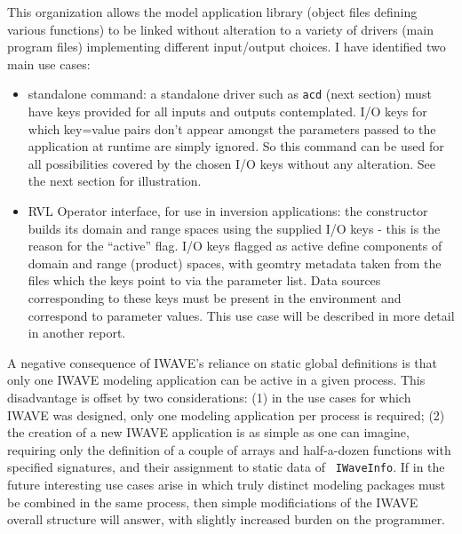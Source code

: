 This organization allows the model application library (object files
defining various functions) to be linked
without alteration to a variety of
drivers (main program files) implementing different input/output 
choices. I have identified two main use cases:
\begin{itemize}
\item standalone command: a standalone driver such as {\tt acd} (next
  section) must have keys provided for all inputs and outputs
  contemplated. I/O keys for which key=value pairs don't appear
  amongst the parameters passed to the application at runtime are simply
  ignored. So this command can be used for all possibilities covered
  by the chosen I/O keys without any alteration. See the next section
  for illustration.
\item RVL Operator interface, for use in inversion applications: the constructor builds its domain and
  range spaces using the supplied I/O keys - this is the reason for
  the ``active'' flag.  I/O keys flagged as active define components
  of domain and range (product) spaces, with geomtry metadata taken
  from the files which the keys point to via the parameter list. Data
  sources corresponding to these keys must be present in the
  environment and correspond to parameter values. This use case will
  be described in more detail in another report.
\end{itemize}

A negative consequence of IWAVE's reliance on static global
definitions is that only one IWAVE modeling application can be active
in a given process. This disadvantage is offset by two considerations:
(1) in the use cases for which IWAVE was designed, only one modeling
application per process is required; (2) the creation of a new IWAVE
application is as simple as one can imagine, requiring only the
definition of a couple of arrays and half-a-dozen functions with
specified signatures, and their assignment to static data of {\tt
  IWaveInfo}. If in the future interesting use cases arise in which
truly distinct modeling packages must be combined in the same process,
then simple modificiations of the IWAVE overall structure will answer,
with slightly increased burden on the programmer.

